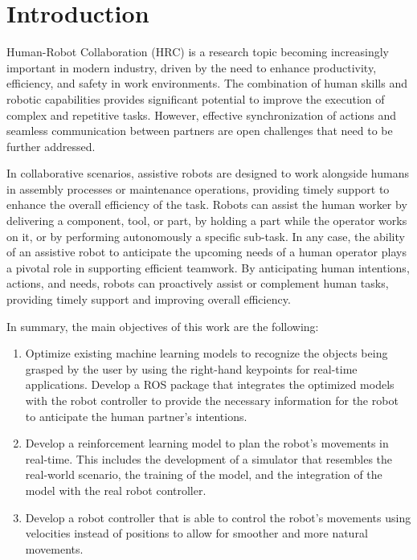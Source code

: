 \section{Introduction}

Human-Robot Collaboration (HRC) is a research topic becoming increasingly important in modern industry, driven by the need to enhance productivity, efficiency, and safety in work environments. The combination of human skills and robotic capabilities provides significant potential to improve the execution of complex and repetitive tasks. However, effective synchronization of actions and seamless communication between partners are open challenges that need to be further addressed.

In collaborative scenarios, assistive robots are designed to work alongside humans in assembly processes or maintenance operations, providing timely support to enhance the overall efficiency of the task. Robots can assist the human worker by delivering a component, tool, or part, by holding a part while the operator works on it, or by performing autonomously a specific sub-task. In any case, the ability of an assistive robot to anticipate the upcoming needs of a human operator plays a pivotal role in supporting efficient teamwork. By anticipating human intentions, actions, and needs, robots can proactively assist or complement human tasks, providing timely support and improving overall efficiency.

In summary, the main objectives of this work are the following:
\begin{enumerate}
    \item Optimize existing machine learning models to recognize the objects being grasped by the user by using the right-hand keypoints for real-time applications. Develop a ROS package that integrates the optimized models with the robot controller to provide the necessary information for the robot to anticipate the human partner's intentions.

    \item Develop a reinforcement learning model to plan the robot's movements in real-time. This includes the development of a simulator that resembles the real-world scenario, the training of the model, and the integration of the model with the real robot controller.

    \item Develop a robot controller that is able to control the robot's movements using velocities instead of positions to allow for smoother and more natural movements.
\end{enumerate}